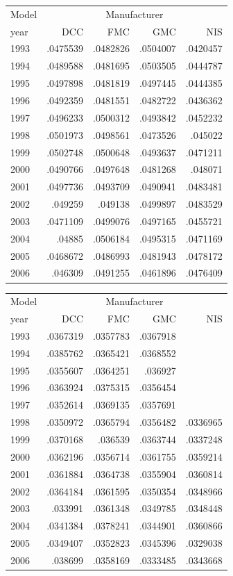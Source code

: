 \begin{tabular}{lrrrr}
\toprule
Model & \multicolumn{4}{c}{Manufacturer} \\
year & DCC & FMC & GMC & NIS \\
\midrule
1993 & .0475539 & .0482826 & .0504007 & .0420457 \\
1994 & .0489588 & .0481695 & .0503505 & .0444787 \\
1995 & .0497898 & .0481819 & .0497445 & .0444385 \\
1996 & .0492359 & .0481551 & .0482722 & .0436362 \\
1997 & .0496233 & .0500312 & .0493842 & .0452232 \\
1998 & .0501973 & .0498561 & .0473526 & .045022 \\
1999 & .0502748 & .0500648 & .0493637 & .0471211 \\
2000 & .0490766 & .0497648 & .0481268 & .048071 \\
2001 & .0497736 & .0493709 & .0490941 & .0483481 \\
2002 & .049259 & .049138 & .0499897 & .0483529 \\
2003 & .0471109 & .0499076 & .0497165 & .0455721 \\
2004 & .04885 & .0506184 & .0495315 & .0471169 \\
2005 & .0468672 & .0486993 & .0481943 & .0478172 \\
2006 & .046309 & .0491255 & .0461896 & .0476409 \\
\bottomrule
\end{tabular}

\begin{tabular}{lrrrr}
\toprule
Model & \multicolumn{4}{c}{Manufacturer} \\
year & DCC & FMC & GMC & NIS \\
\midrule
1993 & .0367319 & .0357783 & .0367918 &  \\
1994 & .0385762 & .0365421 & .0368552 &  \\
1995 & .0355607 & .0364251 & .036927 &  \\
1996 & .0363924 & .0375315 & .0356454 &  \\
1997 & .0352614 & .0369135 & .0357691 &  \\
1998 & .0350972 & .0365794 & .0356482 & .0336965 \\
1999 & .0370168 & .036539 & .0363744 & .0337248 \\
2000 & .0362196 & .0356714 & .0361755 & .0359214 \\
2001 & .0361884 & .0364738 & .0355904 & .0360814 \\
2002 & .0364184 & .0361595 & .0350354 & .0348966 \\
2003 & .033991 & .0361348 & .0349785 & .0348448 \\
2004 & .0341384 & .0378241 & .0344901 & .0360866 \\
2005 & .0349407 & .0352823 & .0345396 & .0329038 \\
2006 & .038699 & .0358169 & .0333485 & .0343668 \\
\bottomrule
\end{tabular}


